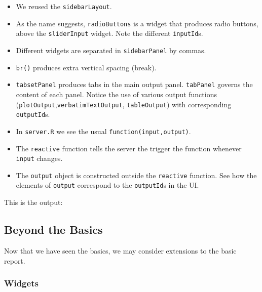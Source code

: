 \documentclass[]{book}
\providecommand{\tightlist}{%
  \setlength{\itemsep}{0pt}\setlength{\parskip}{0pt}}
\theoremstyle{definition}
\theoremstyle{definition}
\theoremstyle{definition}
\theoremstyle{remark}
\begin{document}
\begin{itemize}
\tightlist
\item
  We reused the \texttt{sidebarLayout}.
\item
  As the name suggests, \texttt{radioButtons} is a widget that produces radio buttons, above the \texttt{sliderInput} widget. Note the different \texttt{inputId}s.
\item
  Different widgets are separated in \texttt{sidebarPanel} by commas.
\item
  \texttt{br()} produces extra vertical spacing (break).
\item
  \texttt{tabsetPanel} produces tabs in the main output panel. \texttt{tabPanel} governs the content of each panel. Notice the use of various output functions (\texttt{plotOutput},\texttt{verbatimTextOutput}, \texttt{tableOutput}) with corresponding \texttt{outputId}s.
\item
  In \texttt{server.R} we see the usual \texttt{function(input,output)}.
\item
  The \texttt{reactive} function tells the server the trigger the function whenever \texttt{input} changes.
\item
  The \texttt{output} object is constructed outside the \texttt{reactive} function. See how the elements of \texttt{output} correspond to the \texttt{outputId}s in the UI.
\end{itemize}

This is the output:

\hypertarget{beyond-the-basics}{%
\subsection{Beyond the Basics}\label{beyond-the-basics}}

Now that we have seen the basics, we may consider extensions to the basic report.

\hypertarget{widgets}{%
\subsubsection{Widgets}\label{widgets}}
\end{document}

